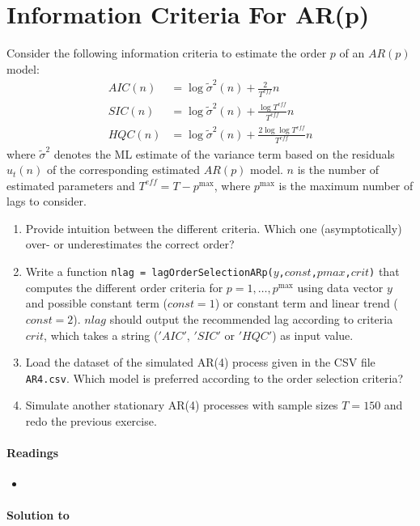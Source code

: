 \section[Information Criteria For AR(p)]{Information Criteria For AR{(p)}\label{ex:InformationCriteriaARp}}
Consider the following information criteria to estimate the order \(p\) of an \(AR(p)\) model: 
\begin{align*}
AIC(n)  &= \log\tilde{\sigma}^2(n) + \frac{2}{T^{eff}}n
\\
SIC(n)  &= \log\tilde{\sigma}^2(n) + \frac{\log T^{eff}}{T^{eff}}n
\\
HQC(n)  &= \log\tilde{\sigma}^2(n) + \frac{2\log \log T^{eff}}{T^{eff}}n
\end{align*}
where \(\tilde{\sigma}^2\) denotes the ML estimate of the variance term
based on the residuals \(\hat{u}_t(n)\) of the corresponding estimated \(AR(p)\) model.
\(n\) is the number of estimated parameters and \(T^{eff}=T-p^{\text{max}}\),
  where \(p^{\text{max}}\) is the maximum number of lags to consider.

\begin{enumerate}

\item
Provide intuition between the different criteria.
Which one (asymptotically) over- or underestimates the correct order?

\item Write a function \texttt{nlag = lagOrderSelectionARp{(\(y\),\(const\),\(pmax\),\(crit\))}}
  that computes the different order criteria for \(p = 1,\ldots ,p^{\text{max}}\)
  using data vector \(y\) and possible constant term (\(const=1\))
  or constant term and linear trend (\(const=2\)).
\(nlag\) should output the recommended lag according to criteria \(crit\),
  which takes a string (\('AIC'\), \('SIC'\) or \('HQC'\)) as input value.

\item
Load the dataset of the simulated AR{(4)} process given in the CSV file \texttt{AR4.csv}.
Which model is preferred according to the order selection criteria?

\item Simulate another stationary AR{(4)} processes with sample sizes \(T = 150\)
  and redo the previous exercise.

\end{enumerate}

\paragraph{Readings}
\begin{itemize}
\item \textcite{Lutkepohl_2004_UnivariateTimeSeries}
\end{itemize}

\begin{solution}\textbf{Solution to }
\ifDisplaySolutions%

\fi
\newpage
\end{solution}